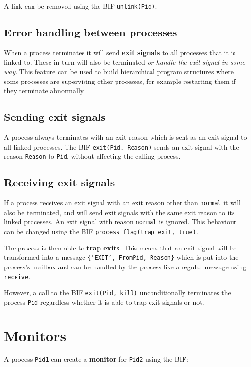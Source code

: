 A link can be removed using the BIF \texttt{unlink(Pid)}.


\subsection{Error handling between processes}
When a process terminates it will send \textbf{exit signals} to all
processes that it is linked to.  These in turn will also be terminated
\textit{or handle the exit signal in some way}. This feature can be
used to build hierarchical program structures where some processes are
supervising other processes, for example restarting them if they
terminate abnormally.


\subsection{Sending exit signals}
\label{processes:sendexitsignals}
A process always terminates with an exit reason which is sent as an
exit signal to all linked processes. The BIF \texttt{exit(Pid, Reason)} sends
an exit signal with the reason \texttt{Reason} to \texttt{Pid}, without
affecting the calling process.


\subsection{Receiving exit signals}
\label{processes:recvexitsignals}
If a process receives an exit signal with an exit reason other than
\texttt{normal} it will also be terminated, and will send exit signals with the
same exit reason to its linked processes.  An exit signal with reason
\texttt{normal} is ignored.  This behaviour can be changed using the BIF
\texttt{process\_flag(trap\_exit, true)}.

The process is then able to \textbf{trap exits}.  This means that an
exit signal will be transformed into a message \texttt{\{'EXIT', FromPid, Reason\}} which is
put into the process's mailbox and can be handled by the process like a regular
message using \texttt{receive}.

However, a call to the BIF \texttt{exit(Pid, kill)} unconditionally
terminates the process \texttt{Pid} regardless whether it is able to
trap exit signals or not.


\section{Monitors}
A process \texttt{Pid1} can create a \textbf{monitor} for
\texttt{Pid2} using the BIF:

